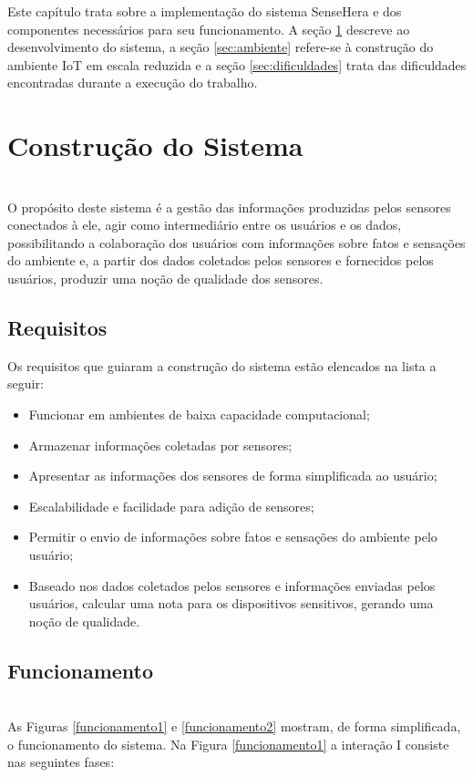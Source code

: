 
\quad Este capítulo trata sobre a implementação do sistema SenseHera e dos componentes necessários para seu funcionamento. A seção \ref{sec:construcao} descreve ao desenvolvimento do sistema, a seção \ref{sec:ambiente} refere-se à construção do ambiente \acrshort{IoT} em escala reduzida e a seção \ref{sec:dificuldades} trata das dificuldades encontradas durante a execução do trabalho.
\section{Construção do Sistema}
\label{sec:construcao}
\\\null \quad O propósito deste sistema é a gestão das informações produzidas pelos sensores conectados à ele, agir como intermediário entre os usuários e os dados, possibilitando a colaboração dos usuários com informações sobre fatos e sensações do ambiente e, a partir dos dados coletados pelos sensores e fornecidos pelos usuários, produzir uma noção de qualidade dos sensores.

\subsection{Requisitos}
\null \quad Os requisitos que guiaram a construção do sistema estão elencados na lista a seguir:
\begin{itemize}
  \item Funcionar em ambientes de baixa capacidade computacional;
  \item Armazenar informações coletadas por sensores;
  \item Apresentar as informações dos sensores de forma simplificada ao usuário;
  \item Escalabilidade e facilidade para adição de sensores;
  \item Permitir o envio de informações sobre fatos e sensações do ambiente pelo usuário;
  \item Baseado nos dados coletados pelos sensores e informações enviadas pelos usuários, calcular uma nota para os dispositivos sensitivos, gerando uma noção de qualidade.
\end{itemize}

\subsection{Funcionamento}
\\\null \quad As Figuras \ref{funcionamento1} e \ref{funcionamento2} mostram, de forma simplificada, o funcionamento do sistema. Na Figura \ref{funcionamento1} a interação I consiste nas seguintes fases:


